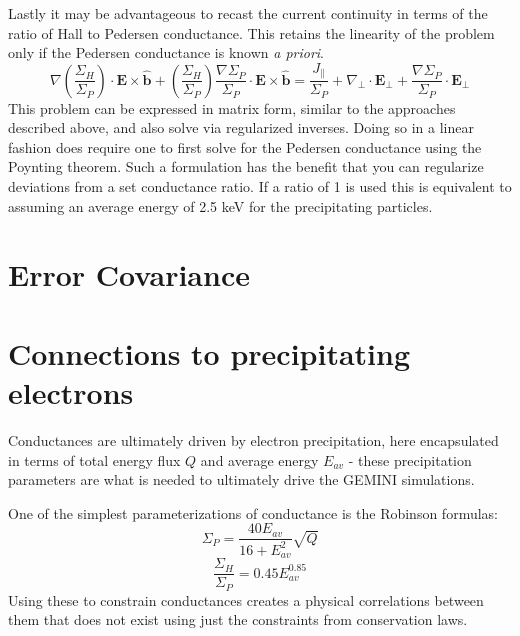 \documentclass[11pt,letterpaper]{article}
\begin{document}
Lastly it may be advantageous to recast the current continuity in terms of the ratio of Hall to Pedersen conductance.  This retains the linearity of the problem only if the Pedersen conductance is known \emph{a priori}.  
\begin{equation}
\nabla \left(  \frac{\Sigma_H}{\Sigma_P}  \right) \cdot \mathbf{E} \times \hat{\mathbf{b}} +  \left(  \frac{\Sigma_H}{\Sigma_P}  \right) \frac{\nabla \Sigma_P}{\Sigma_P}  \cdot \mathbf{E} \times \hat{\mathbf{b}} = \frac{J_\parallel}{\Sigma_P} + \nabla_\perp \cdot \mathbf{E}_\perp + \frac{\nabla \Sigma_P}{\Sigma_P}  \cdot  \mathbf{E}_\perp
\end{equation}
This problem can be expressed in matrix form, similar to the approaches described above, and also solve via regularized inverses.  Doing so in a linear fashion does require one to first solve for the Pedersen conductance using the Poynting theorem.  Such a formulation has the benefit that you can regularize deviations from a set conductance ratio.   If a ratio of 1 is used this is equivalent to assuming an average energy of 2.5 keV for the precipitating particles.  



\section{Error Covariance}


\section{Connections to precipitating electrons}

Conductances are ultimately driven by electron precipitation, here encapsulated in terms of total energy flux $Q$ and average energy $E_{av}$ - these precipitation parameters are what is needed to ultimately drive the GEMINI simulations.  

One of the simplest parameterizations of conductance is the Robinson formulas:
\begin{equation}
\Sigma_P = \frac{40 E_{av}}{16+E_{av}^2} \sqrt{Q}
\end{equation}
\begin{equation}
\frac{\Sigma_H}{\Sigma_P} = 0.45 E_{av}^{0.85}
\end{equation}
Using these to constrain conductances creates a physical correlations between them that does not exist using just the constraints from conservation laws.  
\end{document}
